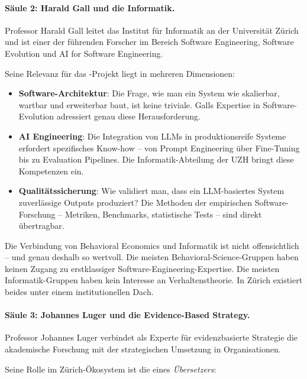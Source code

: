 \paragraph{Säule 2: Harald Gall und die Informatik.}

Professor Harald Gall leitet das Institut für Informatik an der Universität Zürich und ist einer der führenden Forscher im Bereich Software Engineering, Software Evolution und AI for Software Engineering.

Seine Relevanz für das \BCM-Projekt liegt in mehreren Dimensionen:

\begin{itemize}
    \item \textbf{Software-Architektur}: Die Frage, wie man ein System wie \BEATRIX{} skalierbar, wartbar und erweiterbar baut, ist keine triviale. Galls Expertise in Software-Evolution adressiert genau diese Herausforderung.

    \item \textbf{AI Engineering}: Die Integration von LLMs in produktionsreife Systeme erfordert spezifisches Know-how -- von Prompt Engineering über Fine-Tuning bis zu Evaluation Pipelines. Die Informatik-Abteilung der UZH bringt diese Kompetenzen ein.

    \item \textbf{Qualitätssicherung}: Wie validiert man, dass ein LLM-basiertes System zuverlässige Outputs produziert? Die Methoden der empirischen Software-Forschung -- Metriken, Benchmarks, statistische Tests -- sind direkt übertragbar.
\end{itemize}

Die Verbindung von Behavioral Economics und Informatik ist nicht offensichtlich -- und genau deshalb so wertvoll. Die meisten Behavioral-Science-Gruppen haben keinen Zugang zu erstklassiger Software-Engineering-Expertise. Die meisten Informatik-Gruppen haben kein Interesse an Verhaltenstheorie. In Zürich existiert beides unter einem institutionellen Dach.

\paragraph{Säule 3: Johannes Luger und die Evidence-Based Strategy.}

Professor Johannes Luger verbindet als Experte für evidenzbasierte Strategie die akademische Forschung mit der strategischen Umsetzung in Organisationen.

Seine Rolle im Zürich-Ökosystem ist die eines \textit{Übersetzers}:

